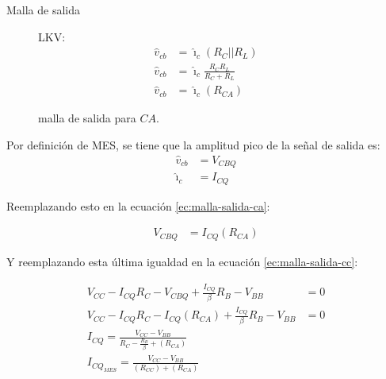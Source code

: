 \begin{frame}[allowframebreaks]{Malla de salida}
\begin{figure}[!ht]
  \centering
  \begin{minipage}{0.45\textwidth}
    \caption{malla de salida para $CA$.}
    \label{fig:malla-salida-ca}
  \end{minipage}
  \begin{minipage}{0.45\textwidth}
    \centering
    LKV:
    \begin{align}
        \hat{v}_{cb} &= \hat{\imath}_c(R_C ||R_L) \nonumber \\[6pt]
        \hat{v}_{cb} &= \hat{\imath}_c\frac{R_C R_L}{R_C + R_L} \nonumber \\[6pt]
        \hat{v}_{cb} &= \hat{\imath}_c(R_{CA}) \label{ec:malla-salida-ca}
    \end{align}
  \end{minipage}
\end{figure}

Por definición de MES, se tiene que la amplitud pico de la señal de salida es:
\begin{align*}
    \hat{v}_{cb} &= V_{CBQ}\\[6pt]
    \hat{\imath}_c &= I_{CQ}
\end{align*}

Reemplazando esto en la ecuación \ref{ec:malla-salida-ca}:

\begin{align*}
    V_{CBQ} &= I_{CQ}(R_{CA})
\end{align*}

Y reemplazando esta última igualdad en la ecuación \ref{ec:malla-salida-cc}:

\begin{align}
    V_{CC} - I_{CQ}R_C - V_{CBQ} + \frac{I_{CQ}}{\beta}R_B - V_{BB} &= 0 \nonumber \\[6pt]
    V_{CC} - I_{CQ}R_C - I_{CQ}(R_{CA}) + \frac{I_{CQ}}{\beta}R_B - V_{BB} &= 0 \nonumber \\[6pt]
    I_{CQ} = \frac{V_{CC} - V_{BB}}{R_C-\frac{R_B}{\beta} + (R_{CA})} \\[6pt]
    I_{CQ_{MES}} = \frac{V_{CC} - V_{BB}}{(R_{CC}) + (R_{CA})} \label{ec:iq-mes}
\end{align}


\end{frame}
